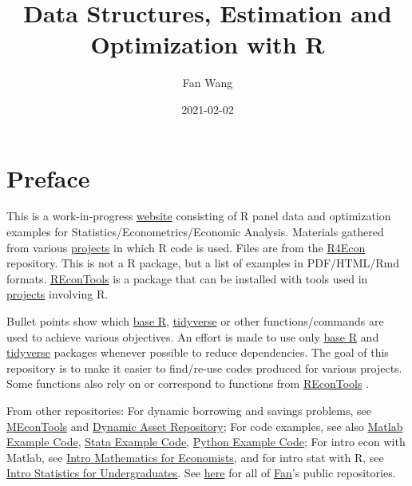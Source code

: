 \documentclass[
]{book}
\title{Data Structures, Estimation and Optimization with R}
\author{Fan Wang}
\date{2021-02-02}
\begin{document}
\maketitle

{
\hypersetup{linkcolor=}
\setcounter{tocdepth}{1}
\tableofcontents
}
\hypertarget{preface}{%
\chapter*{Preface}\label{preface}}

This is a work-in-progress \href{https://fanwangecon.github.io/R4Econ/}{website} consisting of R panel data and optimization examples for Statistics/Econometrics/Economic Analysis. Materials gathered from various \href{https://fanwangecon.github.io/research}{projects} in which R code is used. Files are from the \href{https://github.com/FanWangEcon/R4Econ}{R4Econ} repository. This is not a R package, but a list of examples in PDF/HTML/Rmd formats. \href{https://fanwangecon.github.io/REconTools/}{REconTools} is a package that can be installed with tools used in \href{https://fanwangecon.github.io/research}{projects} involving R.

Bullet points show which \href{https://www.rdocumentation.org/packages/base/versions/3.5.2}{base R}, \href{https://www.tidyverse.org/}{tidyverse} or other functions/commands are used to achieve various objectives. An effort is made to use only \href{https://www.rdocumentation.org/packages/base/versions/3.5.2}{base R} \citep{R-base} and \href{https://www.tidyverse.org/}{tidyverse} \citep{R-tidyverse} packages whenever possible to reduce dependencies. The goal of this repository is to make it easier to find/re-use codes produced for various projects. Some functions also rely on or correspond to functions from \href{https://fanwangecon.github.io/REconTools/}{REconTools} \citep{R-REconTools}.

From other repositories: For dynamic borrowing and savings problems, see \href{https://fanwangecon.github.io/MEconTools/}{MEconTools} and \href{https://fanwangecon.github.io/CodeDynaAsset/}{Dynamic Asset Repository}; For code examples, see also \href{https://fanwangecon.github.io/M4Econ/}{Matlab Example Code}, \href{https://fanwangecon.github.io/Stata4Econ/}{Stata Example Code}, \href{https://fanwangecon.github.io/pyfan/}{Python Example Code}; For intro econ with Matlab, see \href{https://fanwangecon.github.io/Math4Econ/}{Intro Mathematics for Economists}, and for intro stat with R, see \href{https://fanwangecon.github.io/Stat4Econ/}{Intro Statistics for Undergraduates}. See \href{https://github.com/FanWangEcon}{here} for all of \href{https://fanwangecon.github.io/}{Fan}'s public repositories.
\end{document}
